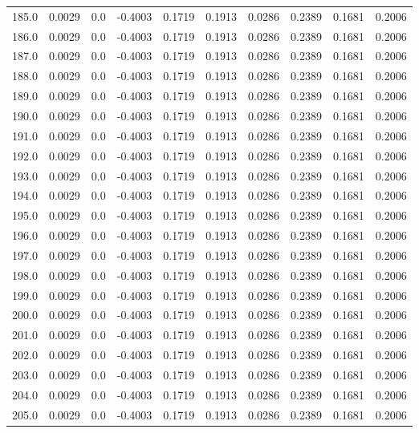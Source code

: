 \begin{longtable}{lrrrrrrrrr}
185.0 & 0.0029 & 0.0 & -0.4003 & 0.1719 & 0.1913 & 0.0286 & 0.2389 & 0.1681 & 0.2006 \\
186.0 & 0.0029 & 0.0 & -0.4003 & 0.1719 & 0.1913 & 0.0286 & 0.2389 & 0.1681 & 0.2006 \\
187.0 & 0.0029 & 0.0 & -0.4003 & 0.1719 & 0.1913 & 0.0286 & 0.2389 & 0.1681 & 0.2006 \\
188.0 & 0.0029 & 0.0 & -0.4003 & 0.1719 & 0.1913 & 0.0286 & 0.2389 & 0.1681 & 0.2006 \\
189.0 & 0.0029 & 0.0 & -0.4003 & 0.1719 & 0.1913 & 0.0286 & 0.2389 & 0.1681 & 0.2006 \\
190.0 & 0.0029 & 0.0 & -0.4003 & 0.1719 & 0.1913 & 0.0286 & 0.2389 & 0.1681 & 0.2006 \\
191.0 & 0.0029 & 0.0 & -0.4003 & 0.1719 & 0.1913 & 0.0286 & 0.2389 & 0.1681 & 0.2006 \\
192.0 & 0.0029 & 0.0 & -0.4003 & 0.1719 & 0.1913 & 0.0286 & 0.2389 & 0.1681 & 0.2006 \\
193.0 & 0.0029 & 0.0 & -0.4003 & 0.1719 & 0.1913 & 0.0286 & 0.2389 & 0.1681 & 0.2006 \\
194.0 & 0.0029 & 0.0 & -0.4003 & 0.1719 & 0.1913 & 0.0286 & 0.2389 & 0.1681 & 0.2006 \\
195.0 & 0.0029 & 0.0 & -0.4003 & 0.1719 & 0.1913 & 0.0286 & 0.2389 & 0.1681 & 0.2006 \\
196.0 & 0.0029 & 0.0 & -0.4003 & 0.1719 & 0.1913 & 0.0286 & 0.2389 & 0.1681 & 0.2006 \\
197.0 & 0.0029 & 0.0 & -0.4003 & 0.1719 & 0.1913 & 0.0286 & 0.2389 & 0.1681 & 0.2006 \\
198.0 & 0.0029 & 0.0 & -0.4003 & 0.1719 & 0.1913 & 0.0286 & 0.2389 & 0.1681 & 0.2006 \\
199.0 & 0.0029 & 0.0 & -0.4003 & 0.1719 & 0.1913 & 0.0286 & 0.2389 & 0.1681 & 0.2006 \\
200.0 & 0.0029 & 0.0 & -0.4003 & 0.1719 & 0.1913 & 0.0286 & 0.2389 & 0.1681 & 0.2006 \\
201.0 & 0.0029 & 0.0 & -0.4003 & 0.1719 & 0.1913 & 0.0286 & 0.2389 & 0.1681 & 0.2006 \\
202.0 & 0.0029 & 0.0 & -0.4003 & 0.1719 & 0.1913 & 0.0286 & 0.2389 & 0.1681 & 0.2006 \\
203.0 & 0.0029 & 0.0 & -0.4003 & 0.1719 & 0.1913 & 0.0286 & 0.2389 & 0.1681 & 0.2006 \\
204.0 & 0.0029 & 0.0 & -0.4003 & 0.1719 & 0.1913 & 0.0286 & 0.2389 & 0.1681 & 0.2006 \\
205.0 & 0.0029 & 0.0 & -0.4003 & 0.1719 & 0.1913 & 0.0286 & 0.2389 & 0.1681 & 0.2006 \\

\end{longtable}
